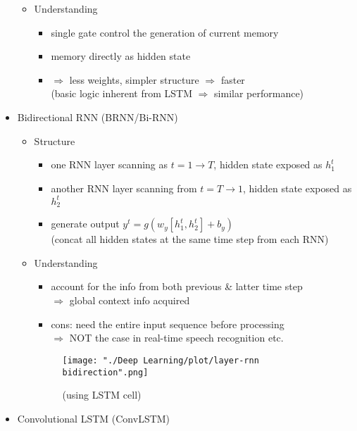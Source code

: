 \begin{itemize}
\begin{itemize}
	\item Understanding
		\begin{itemize}
		\item single gate control the generation of current memory
		\item memory directly as hidden state
		\item $\Rightarrow$ less weights, simpler structure $\Rightarrow$ faster \\
		(basic logic inherent from LSTM $\Rightarrow$ similar performance)
		\end{itemize}
	\end{itemize}


\item Bidirectional RNN (BRNN/Bi-RNN)
	\begin{itemize}
	\item Structure
		\begin{itemize}
		\item one RNN layer scanning as $t=1\rightarrow T$, hidden state exposed as $h_1^t$
		\item another RNN layer scanning from $t=T\rightarrow 1$, hidden state exposed as $h_2^t$
		\item generate output $y^t = g(w_y[h_1^t, h_2^t] + b_y)$ \\ 
		(concat all hidden states at the same time step from each RNN)
		\end{itemize}
	\item Understanding
		\begin{itemize}
		\item account for the info from both previous \& latter time step \\
		$\Rightarrow$ global context info acquired
		\item cons: need the entire input sequence before processing \\
		$\Rightarrow$ NOT the case in real-time speech recognition etc.
		\end{itemize}
		
	\begin{figure}[!h]
	\texttt{[image: "./Deep Learning/plot/layer-rnn bidirection".png]}
	\caption{(using LSTM cell)}
	\end{figure}
	
	\end{itemize}

\item Convolutional LSTM (ConvLSTM)
\end{itemize}

